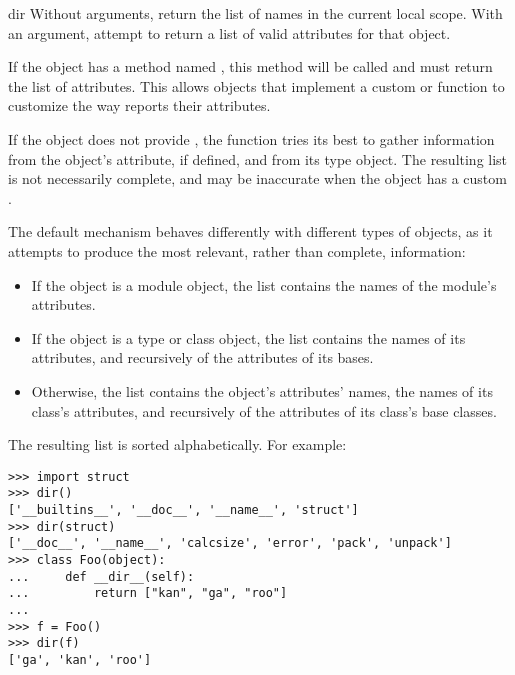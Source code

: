 \begin{funcdesc}{dir}{}
  Without arguments, return the list of names in the current local scope.  With
  an argument, attempt to return a list of valid attributes for that object.

  If the object has a method named , this method will be
  called and must return the list of attributes. This allows objects that
  implement a custom  or 
  function to customize the way  reports their attributes.

  If the object does not provide , the function tries its best
  to gather information from the object's  attribute, if
  defined, and from its type object.  The resulting list is not necessarily
  complete, and may be inaccurate when the object has a custom
  .
  
  The default  mechanism behaves differently with different
  types of objects, as it attempts to produce the most relevant, rather than
  complete, information:
  \begin{itemize}
  \item If the object is a module object, the list contains the names of the
    module's attributes.
  \item If the object is a type or class object, the list contains the names of
    its attributes, and recursively of the attributes of its bases.
  \item Otherwise, the list contains the object's attributes' names, the names
    of its class's attributes, and recursively of the attributes of its class's
    base classes.
  \end{itemize}
  
  The resulting list is sorted alphabetically.  For example:

\begin{verbatim}
>>> import struct
>>> dir()
['__builtins__', '__doc__', '__name__', 'struct']
>>> dir(struct)
['__doc__', '__name__', 'calcsize', 'error', 'pack', 'unpack']
>>> class Foo(object):
...     def __dir__(self):
...         return ["kan", "ga", "roo"]
...
>>> f = Foo()
>>> dir(f)
['ga', 'kan', 'roo']
\end{verbatim}

\end{funcdesc}

